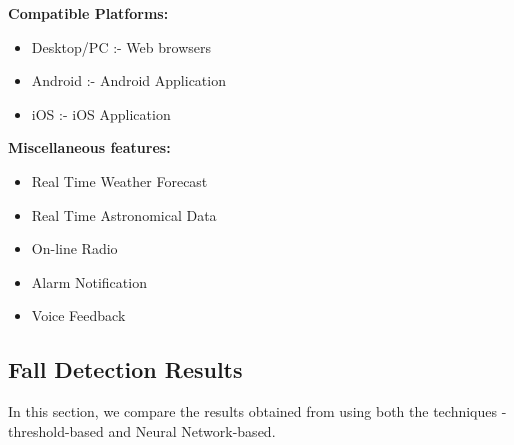 \vspace{10pt}
\textbf{Compatible Platforms:}
\begin{itemize}
\item Desktop/PC :- Web browsers
\item Android :- Android Application
\item iOS :- iOS Application
\end{itemize}

\vspace{10pt}
\textbf{Miscellaneous features:}
\begin{itemize}
\item Real Time Weather Forecast
\item Real Time Astronomical Data
\item On-line Radio 
\item Alarm Notification
\item Voice Feedback
\end{itemize}

\subsection{Fall Detection Results}
In this section, we compare the results obtained from using both the techniques - threshold-based and Neural Network-based.

